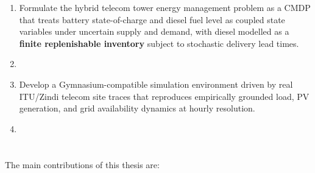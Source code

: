 \begin{enumerate}
  \item Formulate the hybrid telecom tower energy management problem as a CMDP
  that treats battery state-of-charge and diesel fuel level as coupled
  state variables under uncertain supply and demand, with diesel
  modelled as a \textbf{finite replenishable inventory} subject to stochastic
  delivery lead times.



\item {}



  \item Develop a Gymnasium-compatible simulation environment driven by real
  ITU/Zindi telecom site traces that reproduces empirically grounded load,
  PV generation, and grid availability dynamics at hourly resolution.

  

\item {}


\end{enumerate}


\section{\texorpdfstring{}{Contributions}}

The main contributions of this thesis are:


